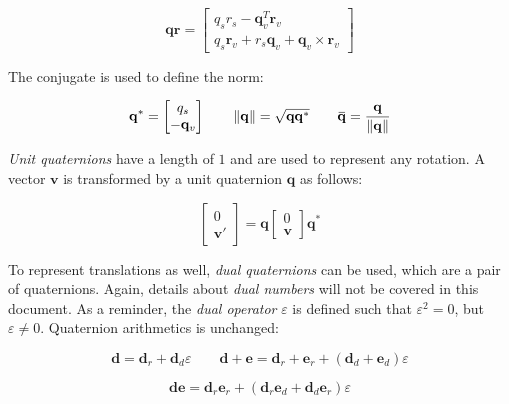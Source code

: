 \documentclass[a4paper,10pt]{article}
\newcommand{\overbar}[1]{\mkern 1.5mu\overline{\mkern-1.5mu#1\mkern-1.5mu}\mkern 1.5mu}
\begin{document}
\begin{multicols}{2}
\begin{equation*}
\mathbf{q} \mathbf{r} = \begin{bmatrix}q_s r_s - \mathbf{q}_v^T \mathbf{r}_v \\ q_s\mathbf{r}_v + r_s\mathbf{q}_v + \mathbf{q}_v \times \mathbf{r}_v \end{bmatrix}
\end{equation*}

The conjugate is used to define the norm:

\begin{equation*}
\mathbf{q}^* = \begin{bmatrix}q_s \\ -\mathbf{q}_v \end{bmatrix}
\qquad
\left\|\mathbf{q}\right\| = \sqrt{\mathbf{q}\mathbf{q}^*}
\qquad
\overbar{\mathbf{q}} = \frac{\mathbf{q}}{\left\|\mathbf{q}\right\|}
\end{equation*}

\emph{Unit quaternions} have a length of $1$ and are used to represent any rotation.
A vector $\mathbf{v}$ is transformed by a unit quaternion $\mathbf{q}$ as follows:

\begin{equation*}
\begin{bmatrix}0 \\ \mathbf{v}' \end{bmatrix} = \mathbf{q} \begin{bmatrix}0 \\ \mathbf{v} \end{bmatrix} \mathbf{q} ^*
\end{equation*}

To represent translations as well, \emph{dual quaternions} can be used, which are a pair of quaternions.
Again, details about \emph{dual numbers} will not be covered in this document.
As a reminder, the \emph{dual operator} $\varepsilon$ is defined such that $\varepsilon^2 = 0$, but $\varepsilon \not= 0$.
Quaternion arithmetics is unchanged:

\begin{equation*}
\mathbf{d} = \mathbf{d}_r + \mathbf{d}_d \varepsilon
\qquad
\mathbf{d} + \mathbf{e} = \mathbf{d}_r + \mathbf{e}_r + \left( \mathbf{d}_d + \mathbf{e}_d\right) \varepsilon
\end{equation*}

\begin{equation*}
\mathbf{d} \mathbf{e} = \mathbf{d}_r \mathbf{e}_r + \left( \mathbf{d}_r \mathbf{e}_d + \mathbf{d}_d \mathbf{e}_r \right)\varepsilon
\end{equation*}


\end{multicols}
\end{document}
